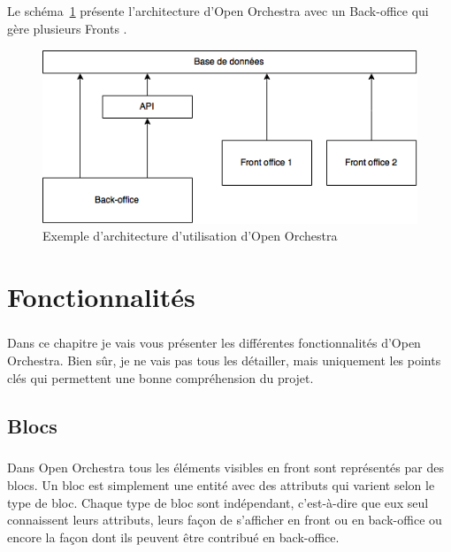 	    \paragraph{}	
		Le schéma~\ref{architecture} présente l'architecture d'Open Orchestra avec un \og Back-office \fg{} qui gère plusieurs \og Fronts \fg{}.
		\begin{figure}[H]
        \begin{center}
          \includegraphics[scale=0.75]{images/architecture_open_orchestra}
        \end{center}
        \caption{Exemple d'architecture d'utilisation d'Open Orchestra}
        \label{architecture}
      \end{figure}

   
\chapter{Fonctionnalités}
	    \paragraph{}
	    Dans ce chapitre je vais vous présenter les différentes fonctionnalités d'Open Orchestra. Bien sûr, je ne vais pas tous les détailler, mais uniquement les points clés qui permettent une bonne compréhension du projet.
	      \section{Blocs}
	        \label{Blocs}  
	       \paragraph{}
	      Dans Open Orchestra tous les éléments visibles en front sont représentés par des blocs. Un bloc est simplement une entité avec des attributs qui varient selon le type de bloc. Chaque type de bloc sont indépendant, c'est-à-dire que eux seul connaissent leurs attributs, leurs façon de s'afficher en front ou en back-office ou encore la façon dont ils peuvent être contribué en back-office. 
